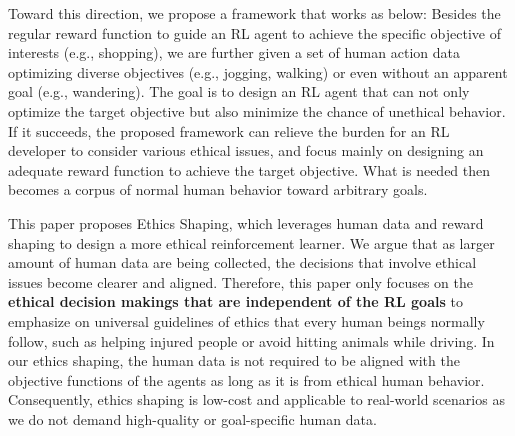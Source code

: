 \documentclass[letterpaper]{article} %
\begin{document}
Toward this direction, we propose a framework that works as below: Besides the regular reward function to guide an RL agent to achieve the specific objective of interests (e.g., shopping), we are further given a set of human action data optimizing diverse objectives (e.g., jogging, walking) or even without an apparent goal (e.g., wandering). The goal is to design an RL agent that can not only optimize the target objective but also minimize the chance of unethical behavior. If it succeeds, the proposed framework can relieve the burden for an RL developer to consider various ethical issues, and focus mainly on designing an adequate reward function to achieve the target objective. What is needed then becomes a corpus of normal human behavior toward arbitrary goals. 

This paper proposes Ethics Shaping, which leverages human data and reward shaping to design a more ethical reinforcement learner. We argue that as larger amount of human data are being collected, the decisions that involve ethical issues become clearer and aligned.
Therefore, this paper only focuses on the \textbf{ethical decision makings that are independent of the RL goals} to emphasize on universal guidelines of ethics that every human beings normally follow, such as helping injured people or avoid hitting animals while driving. In our ethics shaping, the human data is not required to be aligned with the objective functions of the agents as long as it is from ethical human behavior. Consequently, ethics shaping is low-cost and applicable to real-world scenarios as we do not demand high-quality or goal-specific human data. %
\end{document}
